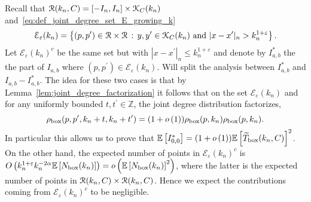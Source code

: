 Recall that ${\mathcal R}(k_n,C) = [-I_n,I_n] \times {\mathcal K}_{C}(k_n)$ and~\eqref{eq:def_joint_degree_set_E_growing_k}
\[
	\mathcal{E}_{\varepsilon}(k_n) = \left\{(p,p^\prime) \in {\mathcal R} \times {\mathcal R}
			\, : \, y,y^\prime \in {\mathcal K}_{C}(k_n) \text{ and } |x - x^\prime|_n > k_n^{1 + \varepsilon} \right\}.
\]
Let $\mathcal{E}_\varepsilon(k_n)^c$ be the same set but with $|x - x^\prime|_n \le k_n^{1 + \varepsilon}$ and denote by $I_{a,b}^\ast$ the the part of $I_{a,b}$ where $(p,p^\prime) \in \mathcal{E}_\varepsilon(k_n)$. Will split the analysis between $I_{a,b}^\ast$ and $I_{a,b} - I_{a,b}^\ast$. The idea for these two cases is that by Lemma~\ref{lem:joint_degree_factorization} it follows that on the set $\mathcal{E}_\varepsilon(k_n)$ and for any uniformly bounded $t, t^\prime \in \mathbb{Z}$, the joint degree distribution factorizes,
\[
	\rho_{\text{box}}(p,p^\prime,k_n + t,k_n+t^\prime) = (1 + o\left(1\right))\rho_{\text{box}}(p,k_n)\rho_{\text{box}}(p,k_n).
\]
In particular this allows us to prove that $\mathbb{E}\left[I_{0,0}^\ast\right] = (1+o\left(1\right))\mathbb{E}\left[\widetilde{T}_{\text{box}}(k_n,C)\right]^2$. 
On the other hand, the expected number of points in $\mathcal{E}_\varepsilon(k_n)^c$ is $O\left(k_n^{1+\varepsilon} k_n^{-2\alpha} \mathbb{E}\left[N_{\text{box}}(k_n)\right]\right) = o\left(\mathbb{E}\left[N_{\text{box}}(k_n)\right]^2\right)$, where the latter is the expected number of points in ${\mathcal R}(k_n,C) \times {\mathcal R}(k_n,C)$. Hence we expect the contributions coming from $\mathcal{E}_\varepsilon(k_n)^c$ to be negligible.

